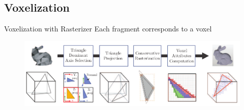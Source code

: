 \documentclass[10pt]{beamer}
\begin{document}

\subsection{Voxelization}
\begin{frame}{Voxelization with Rasterizer}
  Each fragment corresponds to a voxel

  \begin{figure}
    \includegraphics[width=\textwidth]{rasterizedvoxelization}
  \end{figure}
\end{frame}
\end{document}
